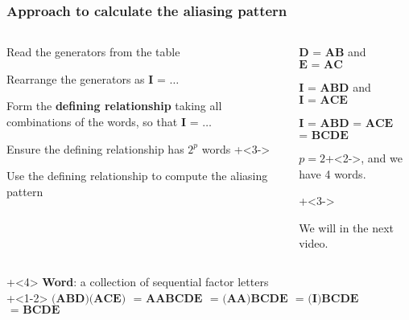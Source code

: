 \begin{frame}\frametitle{Approach to calculate the aliasing pattern}
	
	\begin{columns}[T]
			\begin{enumerate}
				\item	Read the generators from the table 
					\item	Rearrange the generators as  $\textbf{I = \ldots}$
				 	\item	Form the {\color{purple}\textbf{defining relationship}} taking all combinations of the words, so that $\textbf{I = \ldots}$
				 	\item	Ensure the defining relationship has $2^p$ words
				\onslide+<3->{
					\item	Use the defining relationship to compute the aliasing pattern
				}
			\end{enumerate}
			
		\column{0.5\textwidth}
			\begin{enumerate}
				\item	$\textbf{D = AB}$  and $\textbf{E = AC}$ 
					\item	$\textbf{I = ABD}$ and $\textbf{I = ACE}$ 
 					\item	$\textbf{I =}$ $\textbf{ABD}$ $\textbf{= ACE}$ $\textbf{= BCDE}$
					\\ \vspace{0.4cm}
				
					\item	$p=2$\onslide+<2->{, and we have 4 words.}
				
				\onslide+<3->{
					\item	We will in the next video.
					
				}
			\end{enumerate}			
			
	\end{columns}
	\vspace{0.5cm}
	\onslide+<4>{
		{\color{purple}\textbf{Word}}: a collection of sequential factor letters
	}
	\\
	\onslide+<1-2>{
		$\textbf{(ABD)(ACE)}$
		$\textbf{ = AABCDE}$
		$\textbf{ = (AA)BCDE}$
		$\textbf{ = (I)BCDE}$
		$\textbf{ = BCDE}$	
	}
\end{frame}

